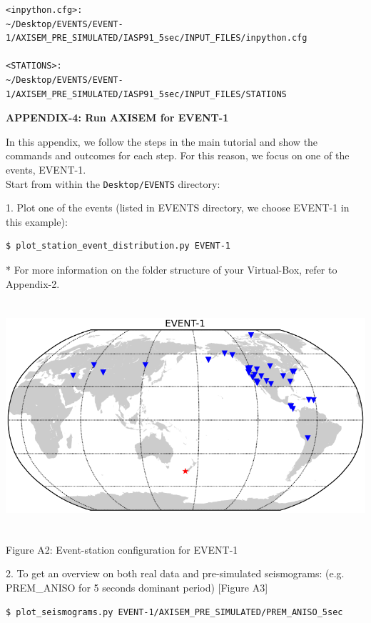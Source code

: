 \documentclass{article}
\begin{document}
\begin{verbatim}
<inpython.cfg>: 
~/Desktop/EVENTS/EVENT-1/AXISEM_PRE_SIMULATED/IASP91_5sec/INPUT_FILES/inpython.cfg

<STATIONS>:
~/Desktop/EVENTS/EVENT-1/AXISEM_PRE_SIMULATED/IASP91_5sec/INPUT_FILES/STATIONS
\end{verbatim}

\newpage

{\large{}\textbf{APPENDIX-4: Run AXISEM for EVENT-1}}

In this appendix, we follow the steps in the main tutorial and show the commands 
and outcomes for each step. For this reason, we focus on one of the events, EVENT-1. \\

Start from within the \verb|Desktop/EVENTS| directory:

1. Plot one of the events (listed in EVENTS directory, we choose EVENT-1 in this example):
\begin{verbatim}
$ plot_station_event_distribution.py EVENT-1
\end{verbatim}
* For more information on the folder structure of your Virtual-Box, refer to Appendix-2.

\begin{center}
\includegraphics[width=444pt, height=240pt, keepaspectratio=true]{AXISEMTutorial-fig006.png}

{\small{}Figure A2: Event-station configuration for EVENT-1}
\end{center}

\baselineskip=13pt
\leftskip=0pt
2. To get an overview on both real data and pre-simulated seismograms: (e.g. PREM\_ANISO 
for 5 seconds dominant period) [Figure A3]
\begin{verbatim}
$ plot_seismograms.py EVENT-1/AXISEM_PRE_SIMULATED/PREM_ANISO_5sec
\end{verbatim}
\end{document}
